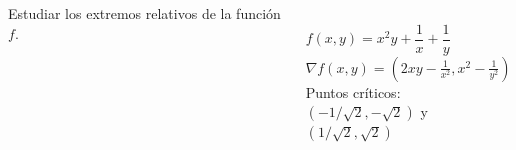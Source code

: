 \documentclass[aspectratio=149,10pt,xcolor=dvipsnames,t]{beamer}
\begin{document}
\begin{frame}
\begin{columns}
\begin{column}[T]{0.6\textwidth}
Estudiar los extremos relativos de la función $f$.
\end{column}
\begin{column}[T]{0.4\textwidth}
\\
$f(x,y)=x^2y + \dfrac{1}{x} + \dfrac{1}{y}$\\
$\nabla f(x,y)=\left(2xy-\frac{1}{x^2},x^2-\frac{1}{y^2}\right)$\\
Puntos críticos: \\
$(-1/\sqrt{2},-\sqrt{2})$ y $(1/\sqrt{2},\sqrt{2})$
\end{column}
\end{columns}
\end{frame}
\end{document}
